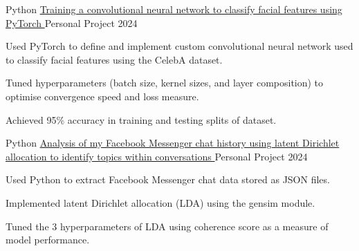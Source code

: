 

\begin{cventries}

  \cventry
    {Python}
    {\href{https://github.com/Harry2687/Gender-Prediction}{Training a convolutional neural network to classify facial features using PyTorch \ExternalLink}}
    {Personal Project}
    {2024}
    {
      \begin{cvitems}
        \item {Used PyTorch to define and implement custom convolutional neural network used to classify facial features using the CelebA dataset.}
        \item {Tuned hyperparameters (batch size, kernel sizes, and layer composition) to optimise convergence speed and loss measure.}
        \item {Achieved 95\% accuracy in training and testing splits of dataset.}
      \end{cvitems}
    }

  \cventry
    {Python}
    {\href{https://github.com/Harry2687/Messenger-Analysis}{Analysis of my Facebook Messenger chat history using latent Dirichlet allocation to identify topics within conversations \ExternalLink}}
    {Personal Project}
    {2024}
    {
      \begin{cvitems}
        \item {Used Python to extract Facebook Messenger chat data stored as JSON files.}
        \item {Implemented latent Dirichlet allocation (LDA) using the gensim module.}
        \item {Tuned the 3 hyperparameters of LDA using coherence score as a measure of model performance.}
      \end{cvitems}
    }


\end{cventries}
